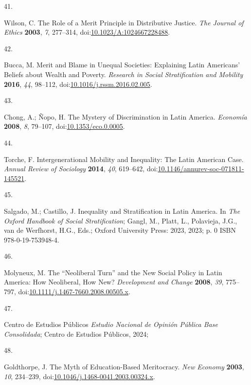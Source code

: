 \documentclass[
  12pt,
  letterpaper,
]{article}
\newlength{\cslhangindent}
\newlength{\csllabelwidth}
\newenvironment{CSLReferences}[2] %
 {\begin{list}{}{%
  \setlength{\itemindent}{0pt}
  \setlength{\leftmargin}{0pt}
  \setlength{\parsep}{0pt}
  \ifodd #1
   \setlength{\leftmargin}{\cslhangindent}
   \setlength{\itemindent}{-1\cslhangindent}
  \fi
  \setlength{\itemsep}{#2\baselineskip}}}
 {\end{list}}
\newcommand{\CSLLeftMargin}[1]{\parbox[t]{\csllabelwidth}{\strut#1\strut}}
\newcommand{\CSLRightInline}[1]{\parbox[t]{\linewidth - \csllabelwidth}{\strut#1\strut}}
\begin{document}
\begin{CSLReferences}{0}{0}
\CSLLeftMargin{41. }%
\CSLRightInline{Wilson, C. The {Role} of a {Merit Principle} in
{Distributive Justice}. \emph{The Journal of Ethics} \textbf{2003},
\emph{7}, 277--314,
doi:\href{https://doi.org/10.1023/A:1024667228488}{10.1023/A:1024667228488}.}

\CSLLeftMargin{42. }%
\CSLRightInline{Bucca, M. Merit and Blame in Unequal Societies:
{Explaining Latin Americans}' Beliefs about Wealth and Poverty.
\emph{Research in Social Stratification and Mobility} \textbf{2016},
\emph{44}, 98--112,
doi:\href{https://doi.org/10.1016/j.rssm.2016.02.005}{10.1016/j.rssm.2016.02.005}.}

\CSLLeftMargin{43. }%
\CSLRightInline{Chong, A.; Ñopo, H. The {Mystery} of {Discrimination} in
{Latin America}. \emph{Econom{í}a} \textbf{2008}, \emph{8}, 79--107,
doi:\href{https://doi.org/10.1353/eco.0.0005}{10.1353/eco.0.0005}.}

\CSLLeftMargin{44. }%
\CSLRightInline{Torche, F. Intergenerational {Mobility} and
{Inequality}: {The Latin American Case}. \emph{Annual Review of
Sociology} \textbf{2014}, \emph{40}, 619--642,
doi:\href{https://doi.org/10.1146/annurev-soc-071811-145521}{10.1146/annurev-soc-071811-145521}.}

\CSLLeftMargin{45. }%
\CSLRightInline{Salgado, M.; Castillo, J. Inequality and
{Stratification} in {Latin America}. In \emph{The {Oxford Handbook} of
{Social Stratification}}; Gangl, M., Platt, L., Polavieja, J.G., van de
Werfhorst, H.G., Eds.; Oxford University Press: 2023, 2023; p. 0 ISBN
978-0-19-753948-4.}

\CSLLeftMargin{46. }%
\CSLRightInline{Molyneux, M. The {``{Neoliberal Turn}''} and the {New
Social Policy} in {Latin America}: {How Neoliberal}, {How New}?
\emph{Development and Change} \textbf{2008}, \emph{39}, 775--797,
doi:\href{https://doi.org/10.1111/j.1467-7660.2008.00505.x}{10.1111/j.1467-7660.2008.00505.x}.}

\CSLLeftMargin{47. }%
\CSLRightInline{Centro de Estudios Públicos \emph{Estudio {Nacional} de
{Opini{ó}n P{ú}blica Base Consolidada}}; Centro de Estudios P{ú}blicos,
2024;}

\CSLLeftMargin{48. }%
\CSLRightInline{Goldthorpe, J. The Myth of Education-Based Meritocracy.
\emph{New Economy} \textbf{2003}, \emph{10}, 234--239,
doi:\href{https://doi.org/10.1046/j.1468-0041.2003.00324.x}{10.1046/j.1468-0041.2003.00324.x}.}


\end{CSLReferences}
\end{document}
